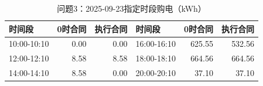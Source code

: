 \begin{table}[H]\centering\small\caption{问题3：2025-09-23指定时段购电（kWh）}\label{tab:q320250923p}
\begin{tabular}{lrrlrr}\toprule
时间段 & 0时合同 & 执行合同 & 时间段 & 0时合同 & 执行合同\\\midrule
10:00-10:10 & 0.00 & 0.00 & 16:00-16:10 & 625.55 & 532.56\\
12:00-12:10 & 8.58 & 8.58 & 18:00-18:10 & 664.56 & 664.56\\
14:00-14:10 & 8.58 & 0.00 & 20:00-20:10 & 37.10 & 37.10\\
\bottomrule\end{tabular}\end{table}

